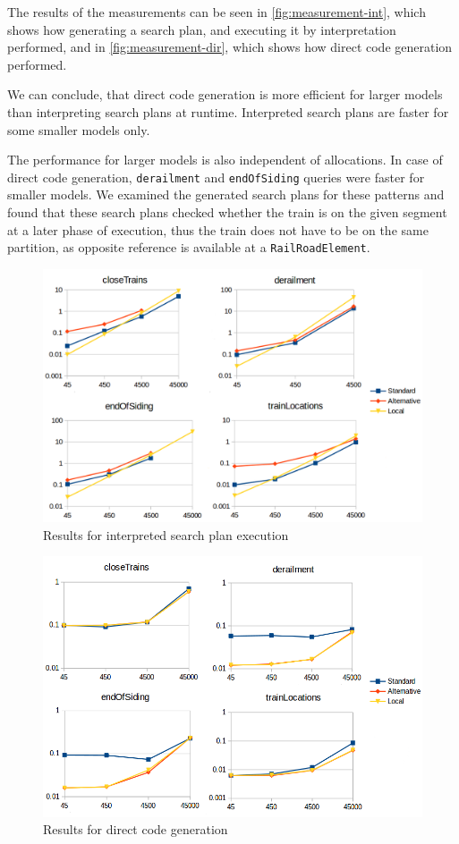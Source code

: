 The results of the measurements can be seen in \autoref{fig:measurement-int}, which shows how generating a search plan, and executing it by interpretation performed, and in \autoref{fig:measurement-dir}, which shows how direct code generation performed.

We can conclude, that direct code generation is more efficient for larger models than interpreting search plans at runtime. Interpreted search plans are faster for some smaller models only.

The performance for larger models is also independent of allocations. In case of direct code generation, \texttt{derailment} and \texttt{endOfSiding} queries were faster for smaller models. 
We examined the generated search plans for these patterns and found that these search plans checked whether the train is on the given segment at a later phase of execution, thus the train does not have to be on the same partition, as opposite reference is available at a \texttt{RailRoadElement}.

\pagebreak
\begin{figure}[H]
	\begin{center}
		\includegraphics[width=\textwidth]{figures/measurement-interpreted-code.png}
		\caption{Results for interpreted search plan execution}
		\label{fig:measurement-int}
	\end{center}
\end{figure}

\begin{figure}[H]
	\begin{center}
		\includegraphics[width=\textwidth]{figures/measurement-directcode.png}
		\caption{Results for direct code generation}
		\label{fig:measurement-dir}
	\end{center}
\end{figure}


